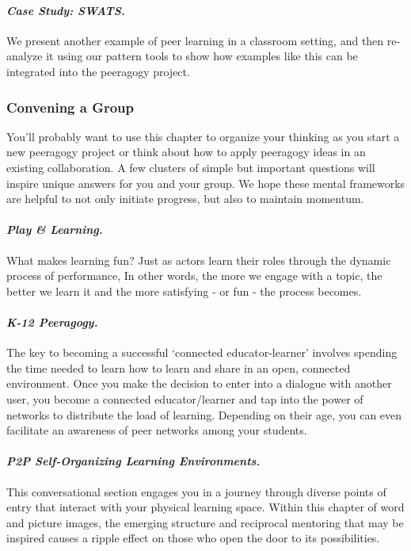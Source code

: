 \paragraph{\emph{Case Study: SWATS.}}
We present another example of peer learning in a classroom setting,
and then re-analyze it using our pattern tools to show how examples
like this can be integrated into the peeragogy project.

\subsubsection{Convening a Group}

\noindent You'll probably want to use this chapter to organize your thinking as
you start a new peeragogy project or think about how to apply peeragogy
ideas in an existing collaboration. A few clusters of simple but
important questions will inspire unique answers for you and your group.
We hope these mental frameworks are helpful to not only initiate
progress, but also to maintain momentum.

 \paragraph{\emph{Play \& Learning.}} What
makes learning fun? Just as actors learn their roles through the dynamic
process of performance, In other words, the more we engage with a topic,
the better we learn it and the more satisfying - or fun - the process
becomes.

\paragraph{\emph{K-12 Peeragogy.}} The key to becoming a successful
`connected educator-learner' involves spending the time needed to learn
how to learn and share in an open, connected environment. Once you make
the decision to enter into a dialogue with another user, you become a
connected educator/learner and tap into the power of networks to
distribute the load of learning. Depending on their age, you can even
facilitate an awareness of peer networks among your students.

\paragraph{\emph{P2P Self-Organizing Learning Environments.}} This conversational
section engages you in a journey through diverse points of entry that
interact with your physical learning space. Within this chapter of word
and picture images, the emerging structure and reciprocal mentoring that
may be inspired causes a ripple effect on those who open the door to its
possibilities.

